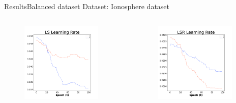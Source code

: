 \documentclass[
	aspectratio=169,	%
	onlytextwidth,		%
	t,					%
	]{beamer}
\begin{document}
	\begin{frame}[fragile]{Results}{Balanced dataset}
		\scriptsize
		Dataset: Ionosphere dataset~\cite{ion} 
		\newline
		
		\begin{columns}
			
			\begin{column}[T]{0.33\textwidth}
				\begin{figure}
					\includegraphics[width=0.9\textwidth]{myfigs/LS_b.png}
				\end{figure}
			\end{column}
		
			\begin{column}[T]{0.33\textwidth}
				\begin{figure}
					\includegraphics[width=0.9\textwidth]{myfigs/LSR_b.png}
				\end{figure}
			\end{column}
		

\end{columns}
\end{frame}
\end{document}
